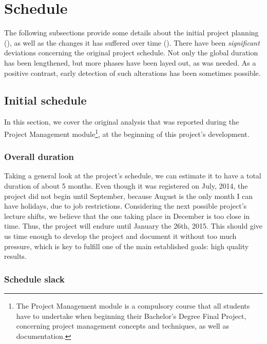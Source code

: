 \section{Schedule}
\label{Management:Schedule}

The following subsections provide some details about the initial project planning (), as well as the changes it has suffered over time (). There have been \textit{significant} deviations concerning the original project schedule. Not only the global duration has been lengthened, but more phases have been layed out, as was needed. As a positive contrast, early detection of such alterations has been sometimes possible.

\subsection{Initial schedule}
\label{Management:Schedule:Initial}

In this section, we cover the original analysis that was reported during the Project Management module\footnote{The Project Management module is a compulsory course that all students have to undertake when beginning their Bachelor's Degree Final Project, concerning project management concepts and techniques, as well as documentation.}, at the beginning of this project's development.

\subsubsection{Overall duration}

Taking a general look at the project’s schedule, we can estimate it to have a total duration of about 5 months. Even though it was registered on July, 2014, the project did not begin until September, because August is the only month I can have holidays, due to job restrictions. Considering the next possible project’s lecture shifts, we believe that the one taking place in December is too close in time. Thus, the project will endure until January the 26th, 2015. This should give us time enough to develop the project and document it without too much pressure, which is key to fulfill one of the main established goals: high quality results.

\subsubsection{Schedule slack}

